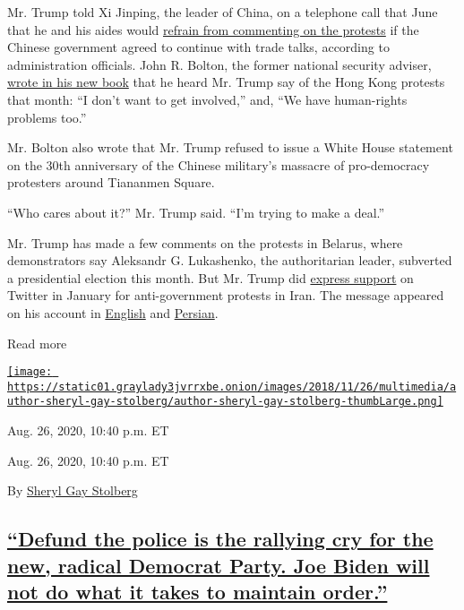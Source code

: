 Mr. Trump told Xi Jinping, the leader of China, on a telephone call that
June that he and his aides would
\href{https://www.ft.com/content/3ef12a1e-a2b8-11e9-a282-2df48f366f7d}{refrain
from commenting on the protests} if the Chinese government agreed to
continue with trade talks, according to administration officials. John
R. Bolton, the former national security adviser,
\href{https://www.wsj.com/articles/john-bolton-the-scandal-of-trumps-china-policy-11592419564}{wrote
in his new book} that he heard Mr. Trump say of the Hong Kong protests
that month: ``I don't want to get involved,'' and, ``We have
human-rights problems too.''

Mr. Bolton also wrote that Mr. Trump refused to issue a White House
statement on the 30th anniversary of the Chinese military's massacre of
pro-democracy protesters around Tiananmen Square.

``Who cares about it?'' Mr. Trump said. ``I'm trying to make a deal.''

Mr. Trump has made a few comments on the protests in Belarus, where
demonstrators say Aleksandr G. Lukashenko, the authoritarian leader,
subverted a presidential election this month. But Mr. Trump did
\href{https://www.politico.com/news/2020/01/11/trump-iran-protesters-tweets-097554}{express
support} on Twitter in January for anti-government protests in Iran. The
message appeared on his account in
\href{https://twitter.com/realDonaldTrump/status/1216114135529902081}{English}
and
\href{https://twitter.com/realDonaldTrump/status/1216114167108849665}{Persian}.

Read more

\href{https://www.nytimes3xbfgragh.onion/by/sheryl-gay-stolberg}{\texttt{[image: https://static01.graylady3jvrrxbe.onion/images/2018/11/26/multimedia/author-sheryl-gay-stolberg/author-sheryl-gay-stolberg-thumbLarge.png]}}

Aug. 26, 2020, 10:40 p.m. ET

Aug. 26, 2020, 10:40 p.m. ET

By
\href{https://www.nytimes3xbfgragh.onion/by/sheryl-gay-stolberg}{Sheryl
Gay Stolberg}

\hypertarget{defund-the-police-is-the-rallying-cry-for-the-new-radical-democrat-party-joe-biden-will-not-do-what-it-takes-to-maintain-order}{%
\subsection{\texorpdfstring{\protect\hyperlink{defund-the-police-is-the-rallying-cry-for-the-new-radical-democrat-party-joe-biden-will-not-do-what-it-takes-to-maintain-order}{``Defund
the police is the rallying cry for the new, radical Democrat Party. Joe
Biden will not do what it takes to maintain
order.''}}{``Defund the police is the rallying cry for the new, radical Democrat Party. Joe Biden will not do what it takes to maintain order.''}}\label{defund-the-police-is-the-rallying-cry-for-the-new-radical-democrat-party-joe-biden-will-not-do-what-it-takes-to-maintain-order}}

